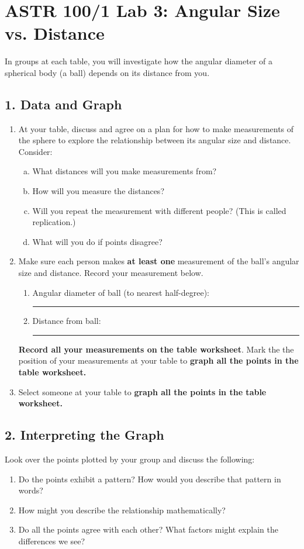 \documentclass[main.tex]{subfiles}
\begin{document}
\section*{ASTR 100/1 Lab 3: Angular Size vs. Distance}
In groups at each table, you will investigate how the angular diameter of a spherical body (a ball) depends on its distance from you.

\subsection*{1. Data and Graph}
\begin{enumerate}
\item At your table, discuss and agree on a plan for how to make measurements of the sphere to explore the relationship between its angular size and distance. Consider:
	\begin{enumerate}[a.]
	\item What distances will you make measurements from?
	\item How will you measure the distances?
	\item Will you repeat the measurement with different people? (This is called replication.)
	\item What will you do if points disagree?
	\end{enumerate}

\item Make sure each person makes \textbf{at least one} measurement of the ball's angular size and distance. Record your measurement below.
	\begin{enumerate}
	\item Angular diameter of ball (to nearest half-degree): \rule{2cm}{.15mm}
	\item Distance from ball: \rule{2cm}{.15mm}
	\end{enumerate}
    
\textbf{Record all your measurements on the table worksheet}. Mark the the position of your measurements at your table to \textbf{graph all the points in the table worksheet.}

\item Select someone at your table to \textbf{graph all the points in the table worksheet.}
\end{enumerate}

\subsection*{2. Interpreting the Graph}
Look over the points plotted by your group and discuss the following:
\begin{enumerate}
\item Do the points exhibit a pattern? How would you describe that pattern in words?
\item How might you describe the relationship mathematically?
\item Do all the points agree with each other? What factors might explain the differences we see?
\end{enumerate}
\end{document}
